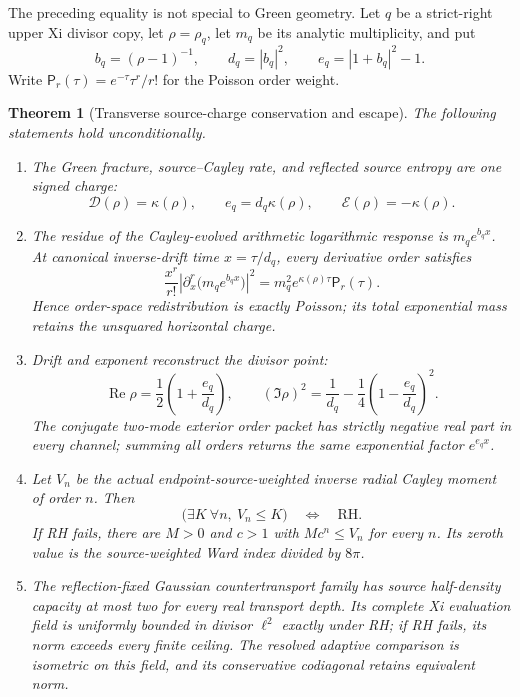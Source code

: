 \documentclass[11pt]{article}
\newtheorem{theorem}{Theorem}[section]
\theoremstyle{definition}
\theoremstyle{remark}
\newcommand{\cD}{\mathcal D}
\newcommand{\cE}{\mathcal E}
\newcommand{\Rea}{\operatorname{Re}}
\begin{document}
The preceding equality is not special to Green geometry.  Let \(q\) be a
strict-right upper Xi divisor copy, let \(\rho=\rho_q\), let \(m_q\) be its
analytic multiplicity, and put
\[
 b_q=(\rho-1)^{-1},\qquad
 d_q=|b_q|^2,\qquad
 e_q=|1+b_q|^2-1.
\tag{4.13}\label{eq:cayley-drift-exponent}
\]
Write
\(\mathsf P_r(\tau)=e^{-\tau}\tau^r/r!\) for the Poisson order weight.

\begin{theorem}[Transverse source-charge conservation and escape]
\label{thm:charge-escape}
The following statements hold unconditionally.
\begin{enumerate}[label=\textup{(\roman*)},leftmargin=2em]
\item The Green fracture, source--Cayley rate, and reflected source entropy
      are one signed charge:
      \[
       \cD(\rho)=\kappa(\rho),\qquad
       e_q=d_q\kappa(\rho),\qquad
       \cE(\rho)=-\kappa(\rho).
      \tag{4.14}\label{eq:one-transverse-charge}
      \]
\item The residue of the Cayley-evolved arithmetic logarithmic response is
      \(m_qe^{b_qx}\).  At canonical inverse-drift time
      \(x=\tau/d_q\), every derivative order satisfies
      \[
       \frac{x^r}{r!}\left|\partial_x^r
         \bigl(m_qe^{b_qx}\bigr)\right|^2
       =m_q^2e^{\kappa(\rho)\tau}\mathsf P_r(\tau).
      \tag{4.15}\label{eq:poisson-charge-conservation}
      \]
      Hence order-space redistribution is exactly Poisson; its total
      exponential mass retains the unsquared horizontal charge.
\item Drift and exponent reconstruct the divisor point:
      \[
       \Rea\rho=\frac12\left(1+\frac{e_q}{d_q}\right),\qquad
       (\Im\rho)^2=\frac1{d_q}
          -\frac14\left(1-\frac{e_q}{d_q}\right)^2.
      \tag{4.16}\label{eq:cayley-zero-reconstruction}
      \]
      The conjugate two-mode exterior order packet has strictly negative
      real part in every channel; summing all orders returns the same
      exponential factor \(e^{e_qx}\).
\item Let \(V_n\) be the actual endpoint-source-weighted inverse radial
      Cayley moment of order \(n\).  Then
      \[
       \bigl(\exists K\ \forall n,\ V_n\le K\bigr)
       \quad\Longleftrightarrow\quad\mathrm{RH}.
      \tag{4.17}\label{eq:ward-radial-bounded-iff-rh}
      \]
      If RH fails, there are \(M>0\) and \(c>1\) with
      \(Mc^n\le V_n\) for every \(n\).  Its zeroth value is the
      source-weighted Ward index divided by \(8\pi\).
\item The reflection-fixed Gaussian countertransport family has source
      half-density capacity at most two for every real transport depth.
      Its complete Xi evaluation field is uniformly bounded in divisor
      \(\ell^2\) exactly under RH; if RH fails, its norm exceeds every
      finite ceiling.  The resolved adaptive comparison is isometric on
      this field, and its conservative codiagonal retains equivalent norm.
\end{enumerate}
\end{theorem}
\end{document}
